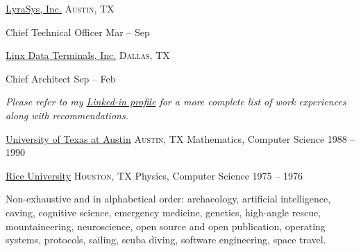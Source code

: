 \documentclass[10pt,letterpaper]{article}
\begin{document}
	\vspace*{1em}
	\headedsection
	{\href{http://lyrasys.com}{LyraSys, Inc.}}
	{\textsc{Austin, TX}} {%
						
		\headedsubsection
		{Chief Technical Officer}
		{Mar  -- Sep }

	}
						
	\vspace*{1em}
	\headedsection
	{\href{http://www.linxdata.com/}{Linx Data Terminals, Inc.}}
	{\textsc{Dallas, TX}} {%
							
		\headedsubsection
		{Chief Architect}
		{Sep  -- Feb }

	}
							
	\vspace{-0.2em}
	\begin{center}
		\emph{\small Please refer to my \href{http://www.linkedin.com/in/jfogarty}{Linked-in profile} for a more complete list of work experiences along with recommendations.}
	\end{center}

\spacedhrule{0.5em}{-0.4em}


\headedsection
{\href{https://www.utexas.edu/}{University of Texas at Austin}}
{\textsc{Austin, TX}} {%
	\headedsubsection
	{Mathematics, Computer Science}
	{1988 -- 1990} {}
}

\headedsection
{\href{http://www.rice.edu/}{Rice University}}
{\textsc{Houston, TX}} {%
	\headedsubsection
	{Physics, Computer Science}
	{1975 -- 1976} {}
}


\vspace{1em}\spacedhrule{-0.2em}{-0.4em}


\inlineheadsection
  {Non-exhaustive and in alphabetical order:}
  {archaeology, artificial intelligence, caving, cognitive science, emergency medicine, genetics, high-angle rescue, mountaineering, neuroscience, open source and open publication, operating systems, protocols, sailing, scuba diving, software engineering, space travel.}
\end{document}
